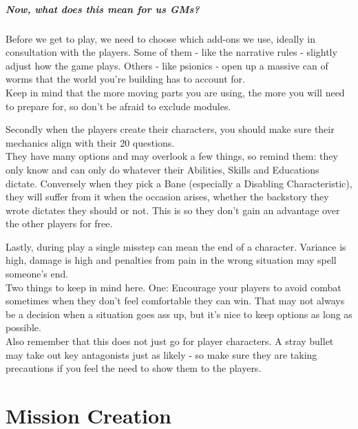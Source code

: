 \documentclass[12pt,a4paper,openany]{book}
\begin{document}
	\paragraph{Now, what does this mean for us GMs?}
	\def\hspacepar{5mm}
	\def\vspacepar{-5mm}
	Before we get to play, we need to choose which add-ons we use, ideally in consultation with the players. Some of them - like the narrative rules - slightly adjust how the game plays. Others - like psionics - open up a massive can of worms that the world you're building has to account for.\\
	\hspace*{\hspacepar} Keep in mind that the more moving parts you are using, the more you will need to prepare for, so don't be afraid to exclude modules.\par \vspace{\vspacepar}
	Secondly when the players create their characters, you should make sure their mechanics align with their 20 questions.\\
	\hspace*{\hspacepar} They have many options and may overlook a few things, so remind them: they only know and can only do whatever their Abilities, Skills and Educations dictate.
	Conversely when they pick a Bane (especially a Disabling Characteristic), they will suffer from it when the occasion arises, whether the backstory they wrote dictates they should or not. This is so they don't gain an advantage over the other players for free.
	\par \vspace{\vspacepar}
	Lastly, during play a single misstep can mean the end of a character. Variance is high, damage is high and penalties from pain in the wrong situation may spell someone's end.\\
	\hspace*{\hspacepar} Two things to keep in mind here. One: Encourage your players to avoid combat sometimes when they don't feel comfortable they can win. That may not always be a decision when a situation goes ass up, but it's nice to keep options as long as possible.\\
	\hspace*{\hspacepar} Also remember that this does not just go for player characters. A stray bullet may take out key antagonists just as likely - so make sure they are taking precautions if you feel the need to show them to the players.

	\chapter{Mission Creation}
	
\end{document}
